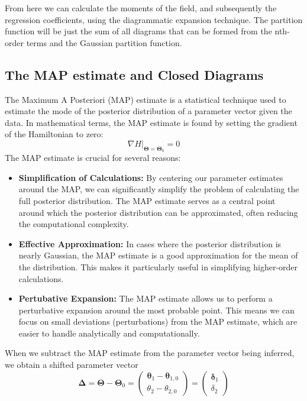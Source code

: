 \documentclass[letterpaper,12pt]{article}
\begin{document}
\vspace*{0.5cm}
From here we can calculate the moments of the field, and subsequently the regression coefficients, using the diagrammatic expansion technique.
The partition function will be just the sum of all diagrams that can be formed from the nth-order terms and the Gaussian partition function.

\subsection{The MAP estimate and Closed Diagrams}
The Maximum A Posteriori (MAP) estimate is a statistical technique used to estimate the mode of the posterior distribution of a parameter vector given the data. 
In mathematical terms, the MAP estimate is found by setting the gradient of the Hamiltonian to zero:
\begin{equation}
    \nabla H |_{\bm{\Theta}=\bm{\Theta}_{0}}  = 0
\end{equation}
The MAP estimate is crucial for several reasons:

\begin{itemize}
    \item \textbf{Simplification of Calculations:} By centering our parameter estimates around the MAP, we can significantly simplify the problem of calculating the full posterior distribution. 
    The MAP estimate serves as a central point around which the posterior distribution can be approximated, often reducing the computational complexity.
    \item \textbf{Effective Approximation:} In cases where the posterior distribution is nearly Gaussian, the MAP estimate is a good approximation for the mean of the distribution. 
    This makes it particularly useful in simplifying higher-order calculations.
    \item \textbf{Pertubative Expansion:} The MAP estimate allows us to perform a perturbative expansion around the most probable point. 
    This means we can focus on small deviations (perturbations) from the MAP estimate, which are easier to handle analytically and computationally.
\end{itemize}

When we subtract the MAP estimate from the parameter vector being inferred, we obtain a shifted parameter vector 
\begin{equation}
    \bm{\Delta} = \bm{\Theta} - \bm{\Theta}_{0} = \begin{pmatrix}
        \bm{\theta}_{1} - \bm{\theta}_{1,0} \\
        \theta_{2} - \theta_{2,0}
    \end{pmatrix} = \begin{pmatrix}
        \bm{\delta}_{1} \\
        \delta_{2}
    \end{pmatrix}
\end{equation}
\end{document}
